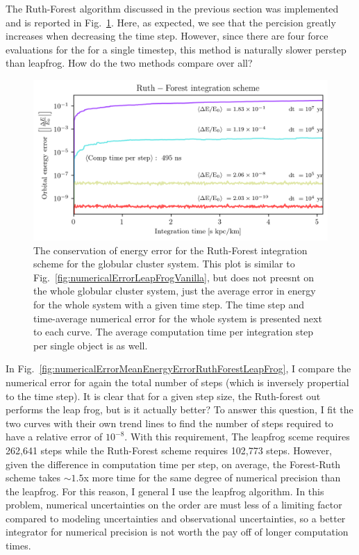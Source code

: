         The Ruth-Forest algorithm discussed in the previous section was implemented and is reported in Fig.~\ref{fig:numericalErrorRuthForest}. Here, as expected, we see that the percision greatly increases when decreasing the time step. However, since there are four force evaluations for the for a single timestep, this method is naturally slower perstep than leapfrog. How do the two methods compare over all?
        \begin{figure}
            \centering
            \includegraphics[width=\linewidth]{images/numericalErrorRuthForest.png}
            \caption{The conservation of energy error for the Ruth-Forest integration scheme for the globular cluster system. This plot is similar to Fig.~\ref{fig:numericalErrorLeapFrogVanilla}, but does not preesnt on the whole globular cluster system, just the average error in energy for the whole system with a given time step. The time step and time-average numerical error for the whole system is presented next to each curve. The average computation time per integration step per single object is as well.}
            \label{fig:numericalErrorRuthForest}
        \end{figure}

        In Fig.~\ref{fig:numericalErrorMeanEnergyErrorRuthForestLeapFrog}, I compare the numerical error for again the total number of steps (which is inversely propertial to the time step). It is clear that for a given step size, the Ruth-forest out performs the leap frog, but is it actually better? To answer this question, I fit the two curves with their own trend lines to find the number of steps required to have a relative error of $10^{-8}$. With this requirement, The leapfrog sceme requires 262,641 steps while the Ruth-Forest scheme requires 102,773 steps. However, given the difference in computation time per step, on average, the Forest-Ruth scheme takes $\sim 1.5$x more time for the same degree of numerical precision than the leapfrog. For this reason, I general I use the leapfrog algorithm. In this problem, numerical uncertainties on the order are must less of a limiting factor compared to modeling uncertainties and observational uncertainties, so a better integrator for numerical precision is not worth the pay off of longer computation times. 

